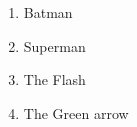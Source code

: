 \documentclass{article}
\begin{document}
	\begin{enumerate}
		\item Batman
		\item Superman
		\item The Flash
		\item The Green arrow
	\end{enumerate}
\end{document}
